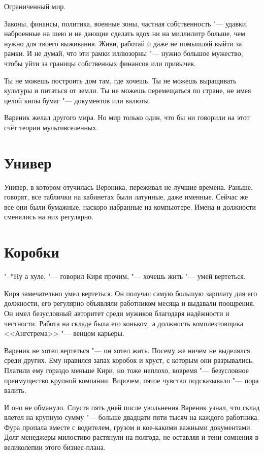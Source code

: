 Ограниченный мир.

Законы, финансы, политика, военные зоны, частная собственность "--- удавки, наброенные на шею и не дающие сделать вдох ни на миллилитр больше, чем нужно для твоего выживания.
Живи, работай и даже не помышляй выйти за рамки.
И не думай, что эти рамки иллюзорны "--- нужно большое мужество, чтобы уйти за границы собственных финансов или привычек.

Ты не можешь построить дом там, где хочешь. 
Ты не можешь выращивать культуры и питаться от земли.
Ты не можешь перемещаться по стране, не имея целой кипы бумаг "--- документов или валюты.

Вареник желал другого мира.
Но мир только один, что бы ни говорили на этот счёт теории мультивселенных.

\section{Универ}

Универ, в котором отучилась Вероника, переживал не лучшие времена.
Раньше, говорят, все таблички на кабинетах были латунные, даже именные.
Сейчас же все они были бумажные, наскоро набранные на компьютере.
Имена и должности сменялись на них регулярно.

\section{Коробки}

"--*Ну а хуле, "--- говорил Киря прочим, "--- хочешь жить "--- умей вертеться.

Киря замечательно умел вертеться.
Он получал самую большую зарплату для его должности, его регулярно объявляли работником месяца и выдавали поощрения.
Он имел безусловный авторитет среди мужиков благодаря надёжности и честности.
Работа на складе была его коньком, а должность комплектовщика <<Ангстрема>> "--- венцом карьеры.

Вареник не хотел вертеться "--- он хотел жить.
Посему же ничем не выделялся среди других.
Ему нравился запах коробок и хруст, с которым они разрывались.
Платили ему гораздо меньше Кири, но тоже неплохо, вовремя "--- безусловное преимущество крупной компании.
Впрочем, пятое чувство подсказывало "--- пора валить.

И оно не обмануло.
Спустя пять дней после увольнения Вареник узнал, что склад влетел на крупную сумму "--- больше двадцати пяти тысяч на каждого работника.
Фура пропала вместе с водителем, грузом и кое-какими важными документами.
Долг менеджеры милостиво растянули на полгода, не оставляя и тени сомнения в великолепии этого бизнес-плана.

